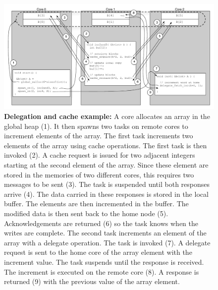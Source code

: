 \begin{figure}[htb] \begin{center}
\includegraphics[width=1.5\columnwidth]{figs/delegate-cache}
\begin{minipage}{1.9\columnwidth} \caption{\label{fig:delegate-cache}
\textbf{Delegation and cache example:} A core allocates an array in the global
heap (1). It then spawns two tasks on remote cores to increment elements of
the array. The first task increments two elements of the array using cache
operations. The first task is then invoked (2). A cache request is issued for two
adjacent integers starting at the second element of the array. Since these
element are stored in the memories of two different cores, this requires two messages to be sent (3). The task is suspended until both responses arrive
(4). The data carried in these responses is stored in the local buffer. The
elements are then incremented in the buffer. The modified data is then sent back
to the home node (5). Acknowledgements are returned (6) so the task
knows when the writes are complete. The second task increments an element of
the array with a delegate operation. The task is invoked (7). A delegate
request is sent to the home core of the array element with the increment
value. The task suspends until the response is received. The increment
is executed on the remote core (8). A response is returned (9) with the
previous value of the array element. } \end{minipage} \vspace{-3ex}
\end{center} \end{figure}

